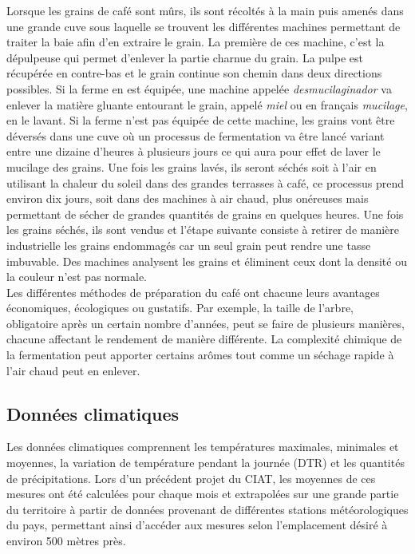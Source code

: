 \noindent Lorsque les grains de café sont mûrs, ils sont récoltés à la main puis amenés dans une grande cuve sous laquelle se trouvent les différentes machines permettant de traiter la baie afin d'en extraire le grain. La première de ces machine, c'est la dépulpeuse qui permet d'enlever la partie charnue du grain. La pulpe est récupérée en contre-bas et le grain continue son chemin dans deux directions possibles. Si la ferme en est équipée, une machine appelée \textit{desmucilaginador} va enlever la matière gluante entourant le grain, appelé \textit{miel} ou en français \textit{mucilage}, en le lavant. Si la ferme n'est pas équipée de cette machine, les grains vont être déversés dans une cuve où un processus de fermentation va être lancé variant entre une dizaine d'heures à plusieurs jours ce qui aura pour effet de laver le mucilage des grains. Une fois les grains lavés, ils seront séchés soit à l'air en utilisant la chaleur du soleil dans des grandes terrasses à café, ce processus prend environ dix jours, soit dans des machines à air chaud, plus onéreuses mais permettant de sécher de grandes quantités de grains en quelques heures. Une fois les grains séchés, ils sont vendus et l'étape suivante consiste à retirer de manière industrielle les grains endommagés car un seul grain peut rendre une tasse imbuvable. Des machines analysent les grains et éliminent ceux dont la densité ou la couleur n'est pas normale.\cite{GuideCafe} \\

\noindent Les différentes méthodes de préparation du café ont chacune leurs avantages économiques, écologiques ou gustatifs. Par exemple, la taille de l'arbre, obligatoire après un certain nombre d'années, peut se faire de plusieurs manières, chacune affectant le rendement de manière différente. La complexité chimique de la fermentation peut apporter certains arômes tout comme un séchage rapide à l'air chaud peut en enlever.


 
\subsection{Données climatiques}
Les données climatiques comprennent les températures maximales, minimales et moyennes, la variation de température pendant la journée (DTR) et les quantités de précipitations. Lors d'un précédent projet du CIAT, les moyennes de ces mesures ont été calculées pour chaque mois et extrapolées sur une grande partie du territoire à partir de données provenant de différentes stations météorologiques du pays, permettant ainsi d’accéder aux mesures selon l’emplacement désiré à environ 500 mètres près. \\

